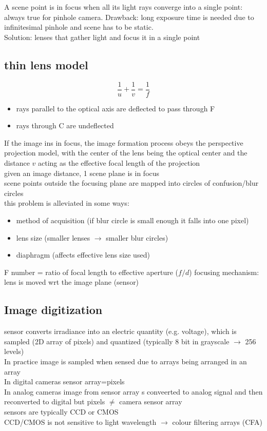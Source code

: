 \documentclass{article}
\begin{document}
A scene point is in focus when all its light rays converge into a single point: always true for pinhole camera. Drawback: long exposure time is needed due to infinitesimal pinhole and scene has to be static.\\
Solution: lenses that gather light and focus it in a single point
\subsection{thin lens model}
\begin{equation}
	\frac{1}{u}+\frac{1}{v}=\frac{1}{f}
\end{equation}
\begin{itemize}
	\item rays parallel to the optical axis are deflected to pass through F
	\item rays through C are undeflected
\end{itemize}
If the image ins in focus, the image formation process obeys the perspective projection model, with the center of the lens being the optical center and the distance $v$ acting as the effective focal length of the projection\\
given an image distance, 1 scene plane is in focus\\
scene points outside the focusing plane are mapped into circles of confusion/blur circles\\
this problem is alleviated in some ways: 
\begin{itemize}
	\item method of acquisition (if blur circle is small enough it falls into one pixel)
	\item lens size (smaller lenses $\rightarrow$ smaller blur circles)
	\item diaphragm (affects effective lens size used)
\end{itemize}
F number = ratio of focal length to effective aperture ($f/d$)
focusing mechanism: lens is moved wrt the image plane (sensor)

\subsection{Image digitization}
sensor converts irradiance into an electric quantity (e.g. voltage), which is sampled (2D array of pixels) and quantized (typically 8 bit in grayscale $\rightarrow$ 256 levels)\\
In practice image is sampled when sensed due to arrays being arranged in an array\\
In digital cameras sensor array=pixels\\
In analog cameras image from sensor array s conveerted to analog signal and then reconverted to digital but pixels $\neq$ camera sensor array\\
sensors are typically CCD or CMOS\\
CCD/CMOS is not sensitive to light wavelength $\rightarrow$ colour filtering arrays (CFA)
\end{document}
